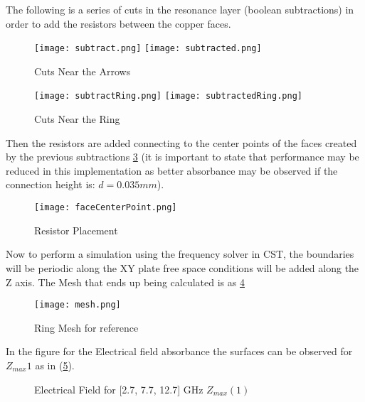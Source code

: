         The following is a series of cuts in the resonance layer (boolean subtractions)
        in order to add the resistors between the copper faces.
        \begin{figure}[h]
            \centering
            \texttt{[image: subtract.png]}\hfil
            \texttt{[image: subtracted.png]}
            \caption{Cuts Near the Arrows}
            \label{img:arrowCuts}
        \end{figure}

        \begin{figure}[h]
            \centering
            \texttt{[image: subtractRing.png]}\hfil
            \texttt{[image: subtractedRing.png]}
            \caption{Cuts Near the Ring}
            \label{img:ringCuts}
        \end{figure}

        Then the resistors are added connecting to the center points of the faces
        created by the previous subtractions \ref{img:resistors} (it is important to state that performance
        may be reduced in this implementation as better absorbance may be observed
        if the connection height is: $d=0.035mm$).
        \begin{figure}[h]
            \centering
            \texttt{[image: faceCenterPoint.png]}
            \caption{Resistor Placement}
            \label{img:resistors}
        \end{figure}

        Now to perform a simulation using the frequency solver in CST, the boundaries will be periodic
        along the XY plate free space conditions will be added along the Z axis.
        The Mesh that ends up being calculated is as \ref{img:RingAndArrowMesh}
        \begin{figure}[h]
            \centering
            \texttt{[image: mesh.png]}
            \caption{Ring Mesh for reference}
            \label{img:RingAndArrowMesh}
        \end{figure}

        In the figure for the Electrical field absorbance the surfaces can be observed for $Z_{max}1$
        as in (\ref{img:E_Zmax1}).
        \begin{figure}[h]
            \centering
             \hfil
             \hfil

            \caption{Electrical Field for [2.7, 7.7, 12.7] GHz $Z_{max}(1)$}
            \label{img:E_Zmax1}
        \end{figure}

